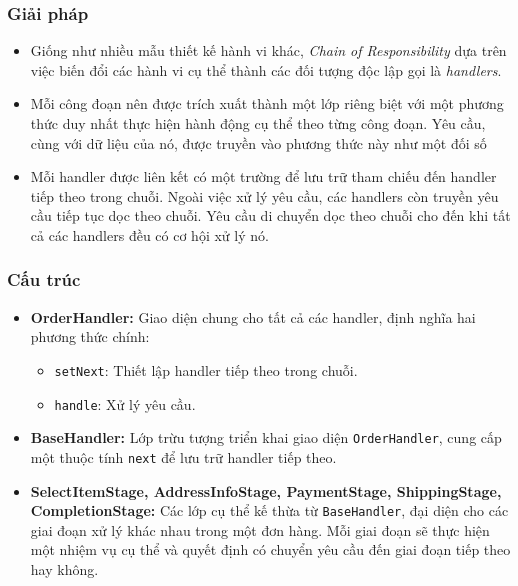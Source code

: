 \subsubsection{Giải pháp}
\begin{flushleft}
	\begin{itemize}
		\item Giống như nhiều mẫu thiết kế hành vi khác, \textit{Chain of Responsibility} dựa trên việc biến đổi các hành vi cụ thể thành các đối tượng độc lập gọi là \textit{handlers}.
		\item Mỗi công đoạn nên được trích xuất thành một lớp riêng biệt với một phương thức duy nhất thực hiện hành động cụ thể theo từng công đoạn. Yêu cầu, cùng với dữ liệu của nó, được truyền vào phương thức này như một đối số
		\item Mỗi handler được liên kết có một trường để lưu trữ tham chiếu đến handler tiếp theo trong chuỗi. Ngoài việc xử lý yêu cầu, các handlers còn truyền yêu cầu tiếp tục dọc theo chuỗi. Yêu cầu di chuyển dọc theo chuỗi cho đến khi tất cả các handlers đều có cơ hội xử lý nó.
	\end{itemize}
\end{flushleft}

\subsubsection{Cấu trúc}
\begin{flushleft}
	\begin{itemize}
		\item \textbf{OrderHandler:} Giao diện chung cho tất cả các handler, định nghĩa hai phương thức chính:
		      \begin{itemize}
			      \item \verb|setNext|: Thiết lập handler tiếp theo trong chuỗi.
			      \item \verb|handle|: Xử lý yêu cầu.
		      \end{itemize}
		\item \textbf{BaseHandler:} Lớp trừu tượng triển khai giao diện \verb|OrderHandler|, cung cấp một thuộc tính \verb|next| để lưu trữ handler tiếp theo.
		\item \textbf{SelectItemStage, AddressInfoStage, PaymentStage, ShippingStage, CompletionStage:} Các lớp cụ thể kế thừa từ \verb|BaseHandler|, đại diện cho các giai đoạn xử lý khác nhau trong một đơn hàng. Mỗi giai đoạn sẽ thực hiện một nhiệm vụ cụ thể và quyết định có chuyển yêu cầu đến giai đoạn tiếp theo hay không.
	\end{itemize}
\end{flushleft}

